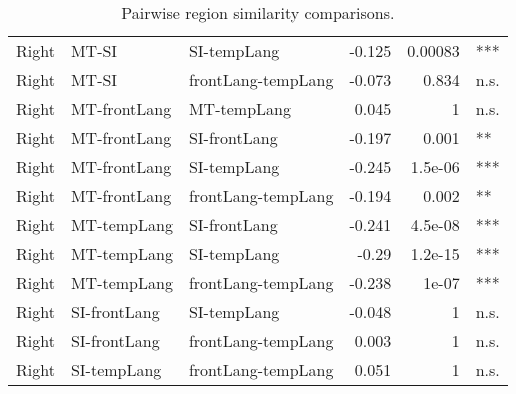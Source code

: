 \begin{table}[h]
\begin{tabular}{lllrrl}
 Right        & MT-SI           & SI-tempLang        &     -0.125 &   0.00083 & ***    \\
 Right        & MT-SI           & frontLang-tempLang &     -0.073 &   0.834   & n.s.   \\
 Right        & MT-frontLang    & MT-tempLang        &      0.045 &   1       & n.s.   \\
 Right        & MT-frontLang    & SI-frontLang       &     -0.197 &   0.001   & **     \\
 Right        & MT-frontLang    & SI-tempLang        &     -0.245 &   1.5e-06 & ***    \\
 Right        & MT-frontLang    & frontLang-tempLang &     -0.194 &   0.002   & **     \\
 Right        & MT-tempLang     & SI-frontLang       &     -0.241 &   4.5e-08 & ***    \\
 Right        & MT-tempLang     & SI-tempLang        &     -0.29  &   1.2e-15 & ***    \\
 Right        & MT-tempLang     & frontLang-tempLang &     -0.238 &   1e-07   & ***    \\
 Right        & SI-frontLang    & SI-tempLang        &     -0.048 &   1       & n.s.   \\
 Right        & SI-frontLang    & frontLang-tempLang &      0.003 &   1       & n.s.   \\
 Right        & SI-tempLang     & frontLang-tempLang &      0.051 &   1       & n.s.   \\
\bottomrule
\end{tabular}
\caption{Pairwise region similarity comparisons.}
\end{table}